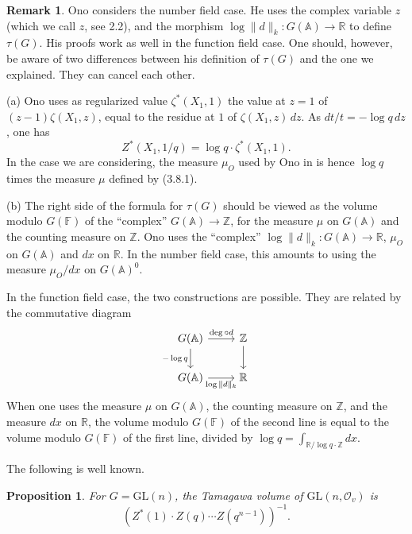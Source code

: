 \documentclass[11pt,a4paper]{article}
\theoremstyle{plain}
\newtheorem{proposition}[theorem]{Proposition}
\theoremstyle{definition}
\newtheorem{remark}[theorem]{Remark}
\newcommand{\Z}{\mathbb{Z}}
\newcommand{\R}{\mathbb{R}}
\newcommand{\GL}{\mathrm{GL}}
\begin{document}
\begin{remark}
Ono considers the number field case. He uses the complex variable $z$ (which we call $z$, see 2.2), and the morphism $\log \|d\|_k: G(\mathbb{A}) \to \R$ to define $\tau(G)$. His proofs work as well in the function field case. One should, however, be aware of two differences between his definition of $\tau(G)$ and the one we explained. They can cancel each other.

(a) Ono uses as regularized value $\zeta^*(X_1,1)$ the value at $z=1$ of $(z-1)\zeta(X_1,z)$, equal to the residue at $1$ of $\zeta(X_1,z)\,dz$. As $dt/t = -\log q \,dz$, one has
\[
Z^*(X_1, 1/q) = \log q \cdot \zeta^*(X_1, 1).
\]
In the case we are considering, the measure $\mu_O$ used by Ono in \cite{O} is hence $\log q$ times the measure $\mu$ defined by (3.8.1).

(b) The right side of the formula for $\tau(G)$ should be viewed as the volume modulo $G(\mathbb{F})$ of the ``complex'' $G(\mathbb{A}) \to \Z$, for the measure $\mu$ on $G(\mathbb{A})$ and the counting measure on $\Z$. Ono uses the ``complex'' $\log \|d\|_k: G(\mathbb{A}) \to \R$, $\mu_O$ on $G(\mathbb{A})$ and $dx$ on $\R$. In the number field case, this amounts to using the measure $\mu_O/dx$ on $G(\mathbb{A})^0$.

In the function field case, the two constructions are possible. They are related by the commutative diagram
\[
\begin{tikzcd}
G(\mathbb{A}) \arrow[r, "\deg \circ d"] \arrow[d, "{-\log q}"'] & \Z \arrow[d] \\
G(\mathbb{A}) \arrow[r, "\log \|d\|_k"'] & \R
\end{tikzcd}
\]
When one uses the measure $\mu$ on $G(\mathbb{A})$, the counting measure on $\Z$, and the measure $dx$ on $\R$, the volume modulo $G(\mathbb{F})$ of the second line is equal to the volume modulo $G(\mathbb{F})$ of the first line, divided by $\log q = \int_{\R/\log q \cdot \Z} dx$.
\end{remark}

The following is well known.

\begin{proposition}
For $G = \GL(n)$, the Tamagawa volume of $\GL(n, \mathcal{O}_v)$ is
\[
(Z^*(1) \cdot Z(q) \cdots Z(q^{n-1}))^{-1}.
\]
\end{proposition}
\end{document}
